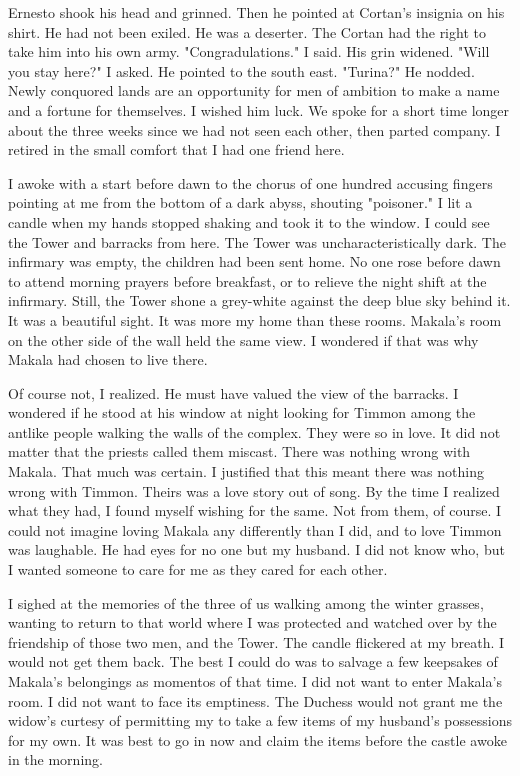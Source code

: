 \documentclass{article}
\begin{document}
Ernesto shook his head and grinned. Then he pointed at Cortan's insignia on his shirt. He had not been exiled. He was a deserter. The Cortan had the right to take him into his own army. "Congradulations." I said. His grin widened. "Will you stay here?" I asked. He pointed to the south east. "Turina?" He nodded. Newly conquored lands are an opportunity for men of ambition to make a name and a fortune for themselves. I wished him luck. We spoke for a short time longer about the three weeks since we had not seen each other, then parted company. I retired in the small comfort that I had one friend here.

I awoke with a start before dawn to the chorus of one hundred accusing fingers pointing at me from the bottom of a dark abyss, shouting "poisoner." I lit a candle when my hands stopped shaking and took it to the window. I could see the Tower and barracks from here. The Tower was uncharacteristically dark. The infirmary was empty, the children had been sent home. No one rose before dawn to attend morning prayers before breakfast, or to relieve the night shift at the infirmary. Still, the Tower shone a grey-white against the deep blue sky behind it. It was a beautiful sight. It was more my home than these rooms. Makala's room on the other side of the wall held the same view. I wondered if that was why Makala had chosen to live there. 

Of course not, I realized. He must have valued the view of the barracks. I wondered if he stood at his window at night looking for Timmon among the antlike people walking the walls of the complex. They were so in love. It did not matter that the priests called them miscast. There was nothing wrong with Makala. That much was certain. I justified that this meant there was nothing wrong with Timmon. Theirs was a love story out of song. By the time I realized what they had, I found myself wishing for the same. Not from them, of course. I could not imagine loving Makala any differently than I did, and to love Timmon was laughable. He had eyes for no one but my husband. I did not know who, but I wanted someone to care for me as they cared for each other.

I sighed at the memories of the three of us walking among the winter grasses, wanting to return to that world where I was protected and watched over by the friendship of those two men, and the Tower. The candle flickered at my breath. I would not get them back. The best I could do was to salvage a few keepsakes of Makala's belongings as momentos of that time. I did not want to enter Makala's room. I did not want to face its emptiness. The Duchess would not grant me the widow's curtesy of permitting my to take a few items of my husband's possessions for my own. It was best to go in now and claim the items before the castle awoke in the morning. 
\end{document}
